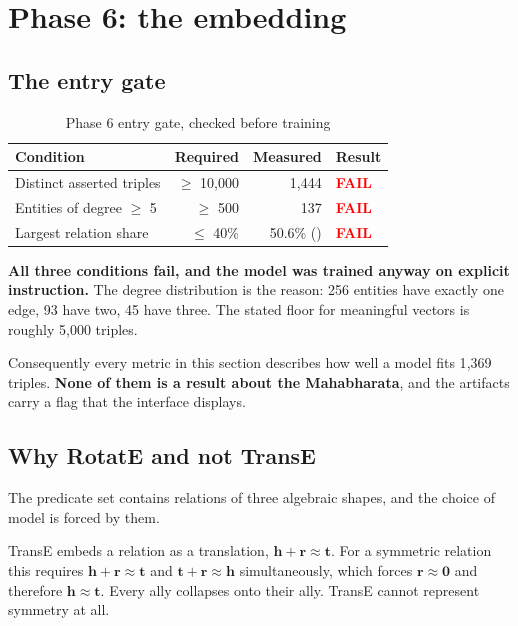 \documentclass[11pt,a4paper]{article}
\newcommand{\pred}[1]{\texttt{\detokenize{#1}}}
\newcommand{\FAIL}{\textcolor{red}{\textbf{FAIL}}}
\begin{document}
\section{Phase 6: the embedding}
\label{sec:embedding}

\subsection{The entry gate}

\begin{table}[h]
\centering
\caption{Phase 6 entry gate, checked before training}
\small
\begin{tabular}{lrrl}
\toprule
\textbf{Condition} & \textbf{Required} & \textbf{Measured} & \textbf{Result} \\
\midrule
Distinct asserted triples & $\geq$ 10{,}000 & 1{,}444 & \FAIL \\
Entities of degree $\geq$ 5 & $\geq$ 500 & 137 & \FAIL \\
Largest relation share & $\leq$ 40\% & 50.6\% (\pred{speaksTo}) & \FAIL \\
\bottomrule
\end{tabular}
\end{table}

\textbf{All three conditions fail, and the model was trained anyway on explicit
instruction.} The degree distribution is the reason: 256 entities have exactly
one edge, 93 have two, 45 have three. The stated floor for meaningful vectors is
roughly 5{,}000 triples.

Consequently every metric in this section describes how well a model fits
1{,}369 triples. \textbf{None of them is a result about the Mahabharata}, and
the artifacts carry a \pred{below_gate} flag that the interface displays.

\subsection{Why RotatE and not TransE}

The predicate set contains relations of three algebraic shapes, and the choice
of model is forced by them.

TransE embeds a relation as a translation, $\mathbf{h} + \mathbf{r} \approx
\mathbf{t}$. For a symmetric relation this requires
$\mathbf{h}+\mathbf{r}\approx\mathbf{t}$ and
$\mathbf{t}+\mathbf{r}\approx\mathbf{h}$ simultaneously, which forces
$\mathbf{r}\approx\mathbf{0}$ and therefore $\mathbf{h}\approx\mathbf{t}$. Every
ally collapses onto their ally. TransE cannot represent symmetry at all.
\end{document}
